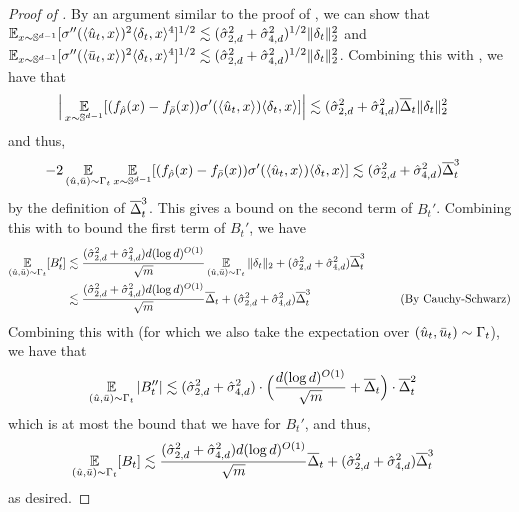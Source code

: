 \begin{proof}[Proof of ]
By an argument similar to the proof of , we can show that $\operatorname*{\mathbb{E}}_{x \sim \mathbb{S}^{d - 1}} [\sigma''(\langle \hat{u}_t, x \rangle)^2 \langle \delta_t, x \rangle^4]^{1/2} \lesssim (\hat{\sigma}_{2, d}^2 + \hat{\sigma}_{4, d}^2)^{1/2} \|\delta_t\|_2^2$ and $\operatorname*{\mathbb{E}}_{x \sim \mathbb{S}^{d - 1}} [\sigma''(\langle \bar{u}_t, x \rangle)^2 \langle \delta_t, x \rangle^4]^{1/2} \lesssim (\hat{\sigma}_{2, d}^2 + \hat{\sigma}_{4, d}^2)^{1/2} \|\delta_t\|_2^2$. Combining this with , we have that
\begin{align}
\Big| \operatorname*{\mathbb{E}}_{x \sim \mathbb{S}^{d - 1}} [(f_{{\hat{\rho}}}(x) - f_{{\bar{\rho}}}(x)) \sigma'(\langle \hat{u}_t, x \rangle) \langle \delta_t, x \rangle] \Big| 
& \lesssim (\hat{\sigma}_{2, d}^2 + \hat{\sigma}_{4, d}^2) \overline{\Delta}_t \|\delta_t\|_2^2
\end{align}
and thus,
\begin{align}
-2 \operatorname*{\mathbb{E}}_{(\hat{u}, \bar{u}) \sim \Gamma_t} \operatorname*{\mathbb{E}}_{x \sim \mathbb{S}^{d - 1}} [(f_{{\hat{\rho}}}(x) - f_{{\bar{\rho}}}(x)) \sigma'(\langle \hat{u}_t, x \rangle) \langle \delta_t, x \rangle]
& \lesssim (\hat{\sigma}_{2, d}^2 + \hat{\sigma}_{4, d}^2) \overline{\Delta}_t^3
\end{align}
by the definition of $\overline{\Delta}_t^3$. This gives a bound on the second term of $B_t'$. Combining this with  to bound the first term of $B_t'$, we have
\begin{align} \label{eq:bt_prime_expectation}
\operatorname*{\mathbb{E}}_{(\hat{u}, \bar{u}) \sim \Gamma_t} [B_t']
& \lesssim \frac{(\hat{\sigma}_{2, d}^2 + \hat{\sigma}_{4, d}^2) d (\log d)^{O(1)}}{\sqrt{m}} \operatorname*{\mathbb{E}}_{(\hat{u}, \bar{u}) \sim \Gamma_t} \|\delta_t\|_2 + (\hat{\sigma}_{2, d}^2 + \hat{\sigma}_{4, d}^2) \overline{\Delta}_t^3 \\
& \lesssim \frac{(\hat{\sigma}_{2, d}^2 + \hat{\sigma}_{4, d}^2) d (\log d)^{O(1)}}{\sqrt{m}} \overline{\Delta}_t + (\hat{\sigma}_{2, d}^2 + \hat{\sigma}_{4, d}^2) \overline{\Delta}_t^3
& \tag{By Cauchy-Schwarz}
\end{align}
Combining this with  (for which we also take the expectation over $(\hat{u}_t, \bar{u}_t) \sim \Gamma_t$), we have that
\begin{align}
\operatorname*{\mathbb{E}}_{(\hat{u}, \bar{u}) \sim \Gamma_t} |B_t''|
& \lesssim (\hat{\sigma}_{2, d}^2 + \hat{\sigma}_{4, d}^2) \cdot \Big(\frac{d (\log d)^{O(1)}}{\sqrt{m}} + \overline{\Delta}_t \Big) \cdot \overline{\Delta}_t^2
\end{align}
which is at most the bound that we have for $B_t'$, and thus,
\begin{align}
\operatorname*{\mathbb{E}}_{(\hat{u}, \bar{u}) \sim \Gamma_t} [B_t]
& \lesssim \frac{(\hat{\sigma}_{2, d}^2 + \hat{\sigma}_{4, d}^2) d (\log d)^{O(1)}}{\sqrt{m}} \overline{\Delta}_t + (\hat{\sigma}_{2, d}^2 + \hat{\sigma}_{4, d}^2) \overline{\Delta}_t^3
\end{align}
as desired.
\end{proof}

